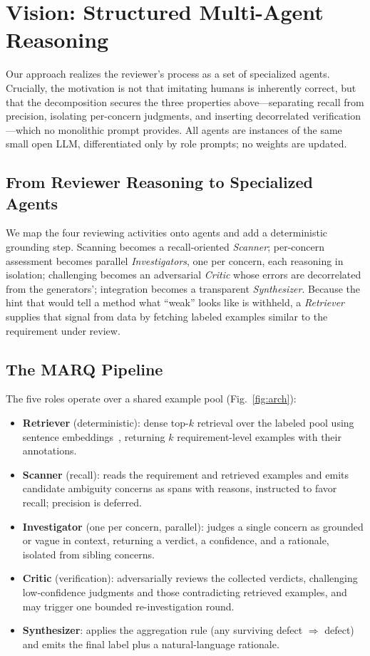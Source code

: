\documentclass[10pt,conference]{IEEEtran}
\begin{document}
\section{Vision: Structured Multi-Agent Reasoning}
\label{sec:vision}
Our approach realizes the reviewer's process as a set of specialized agents. Crucially, the motivation is not that imitating humans is inherently correct, but that the decomposition secures the three properties above---separating recall from precision, isolating per-concern judgments, and inserting decorrelated verification---which no monolithic prompt provides. All agents are instances of the same small open LLM, differentiated only by role prompts; no weights are updated.

\subsection{From Reviewer Reasoning to Specialized Agents}
We map the four reviewing activities onto agents and add a deterministic grounding step. Scanning becomes a recall-oriented \emph{Scanner}; per-concern assessment becomes parallel \emph{Investigators}, one per concern, each reasoning in isolation; challenging becomes an adversarial \emph{Critic} whose errors are decorrelated from the generators'; integration becomes a transparent \emph{Synthesizer}. Because the hint that would tell a method what ``weak'' looks like is withheld, a \emph{Retriever} supplies that signal from data by fetching labeled examples similar to the requirement under review.

\subsection{The MARQ Pipeline}
The five roles operate over a shared example pool (Fig.~\ref{fig:arch}):

\begin{itemize}
\item \textbf{Retriever} (deterministic): dense top-$k$ retrieval over the labeled pool using sentence embeddings~\cite{sbert}, returning $k$ requirement-level examples with their annotations.
\item \textbf{Scanner} (recall): reads the requirement and retrieved examples and emits candidate ambiguity concerns as spans with reasons, instructed to favor recall; precision is deferred.
\item \textbf{Investigator} (one per concern, parallel): judges a single concern as grounded or vague in context, returning a verdict, a confidence, and a rationale, isolated from sibling concerns.
\item \textbf{Critic} (verification): adversarially reviews the collected verdicts, challenging low-confidence judgments and those contradicting retrieved examples, and may trigger one bounded re-investigation round.
\item \textbf{Synthesizer}: applies the aggregation rule (any surviving defect $\Rightarrow$ defect) and emits the final label plus a natural-language rationale.
\end{itemize}
\end{document}
